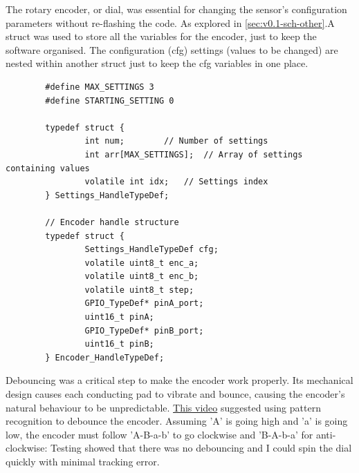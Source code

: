 The rotary encoder, or dial, was essential for changing the sensor's configuration parameters without re-flashing the code. As explored in \autoref{sec:v0.1-sch-other}.A struct was used to store all the variables for the encoder, just to keep the software organised. The configuration (cfg) settings (values to be changed) are nested within another struct just to keep the cfg variables in one place.

\begin{verbatim}
        #define MAX_SETTINGS 3
        #define STARTING_SETTING 0

        typedef struct {
                int num; 		// Number of settings
                int arr[MAX_SETTINGS]; 	// Array of settings containing values
                volatile int idx;	// Settings index
        } Settings_HandleTypeDef;

        // Encoder handle structure
        typedef struct {
                Settings_HandleTypeDef cfg;
                volatile uint8_t enc_a;
                volatile uint8_t enc_b;
                volatile uint8_t step;
                GPIO_TypeDef* pinA_port;
                uint16_t pinA;
                GPIO_TypeDef* pinB_port;
                uint16_t pinB;
        } Encoder_HandleTypeDef;
\end{verbatim}

Debouncing was a critical step to make the encoder work properly. Its mechanical design causes each conducting pad to vibrate and bounce, causing the encoder's natural behaviour to be unpredictable.
\href{https://www.youtube.com/watch?v=sQNPAsZKnDw}{This video} suggested using pattern recognition to debounce the encoder. Assuming 'A' is going high and 'a' is going low, the encoder must follow 'A-B-a-b' to go clockwise and 'B-A-b-a' for anti-clockwise: Testing showed that there was no debouncing and I could spin the dial quickly with minimal tracking error.
